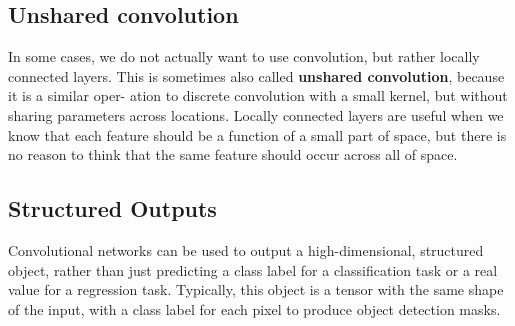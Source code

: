 \subsection{Unshared convolution}
In some cases, we do not actually want to use convolution, but rather locally connected layers. This is sometimes also called \textbf{unshared convolution}, because it is a similar oper- ation to discrete convolution with a small kernel, but without sharing parameters across locations. Locally connected layers are useful when we know that each feature should be
a function of a small part of space, but there is no reason to think that the same feature should occur across all of space.

\subsection{Structured Outputs}
Convolutional networks can be used to output a high-dimensional, structured
object, rather than just predicting a class label for a classification task or a real value for a regression task. Typically, this object is a tensor with the same shape of the input, with a class label for each pixel to produce object detection masks.
